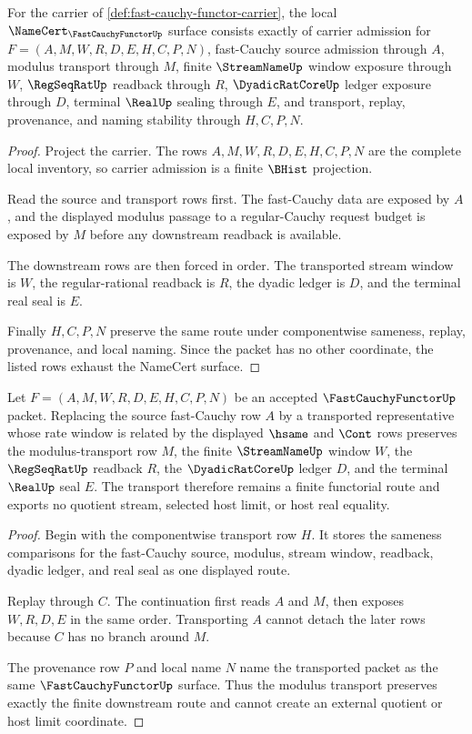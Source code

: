 \begin{theorem}
\label{thm:fast-cauchy-functor-namecert-obligations}
For the carrier of \autoref{def:fast-cauchy-functor-carrier}, the local $\NameCert_{\FastCauchyFunctorUp}$ surface consists exactly of carrier admission for $F=(A,M,W,R,D,E,H,C,P,N)$, fast-Cauchy source admission through $A$, modulus transport through $M$, finite $\StreamNameUp$ window exposure through $W$, $\RegSeqRatUp$ readback through $R$, $\DyadicRatCoreUp$ ledger exposure through $D$, terminal $\RealUp$ sealing through $E$, and transport, replay, provenance, and naming stability through $H,C,P,N$.
\end{theorem}
\begin{proof}
Project the carrier. The rows $A,M,W,R,D,E,H,C,P,N$ are the complete local inventory, so carrier admission is a finite $\BHist$ projection.

Read the source and transport rows first. The fast-Cauchy data are exposed by $A$, and the displayed modulus passage to a regular-Cauchy request budget is exposed by $M$ before any downstream readback is available.

The downstream rows are then forced in order. The transported stream window is $W$, the regular-rational readback is $R$, the dyadic ledger is $D$, and the terminal real seal is $E$.

Finally $H,C,P,N$ preserve the same route under componentwise sameness, replay, provenance, and local naming. Since the packet has no other coordinate, the listed rows exhaust the NameCert surface.
\end{proof}

\begin{theorem}
\label{thm:fast-cauchy-functor-modulus-transport}
Let $F=(A,M,W,R,D,E,H,C,P,N)$ be an accepted $\FastCauchyFunctorUp$ packet. Replacing the source fast-Cauchy row $A$ by a transported representative whose rate window is related by the displayed $\hsame$ and $\Cont$ rows preserves the modulus-transport row $M$, the finite $\StreamNameUp$ window $W$, the $\RegSeqRatUp$ readback $R$, the $\DyadicRatCoreUp$ ledger $D$, and the terminal $\RealUp$ seal $E$. The transport therefore remains a finite functorial route and exports no quotient stream, selected host limit, or host real equality.
\end{theorem}
\begin{proof}
Begin with the componentwise transport row $H$. It stores the sameness comparisons for the fast-Cauchy source, modulus, stream window, readback, dyadic ledger, and real seal as one displayed route.

Replay through $C$. The continuation first reads $A$ and $M$, then exposes $W,R,D,E$ in the same order. Transporting $A$ cannot detach the later rows because $C$ has no branch around $M$.

The provenance row $P$ and local name $N$ name the transported packet as the same $\FastCauchyFunctorUp$ surface. Thus the modulus transport preserves exactly the finite downstream route and cannot create an external quotient or host limit coordinate.
\end{proof}

